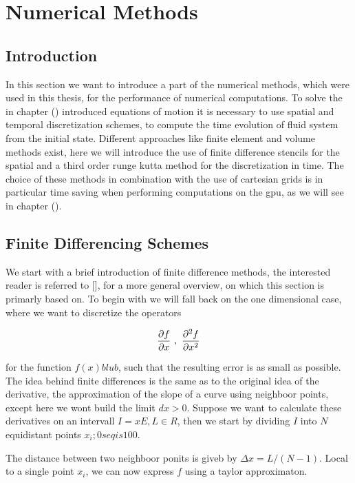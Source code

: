\chapter{Numerical Methods}

\section{Introduction}

In this section we want to introduce a part of the numerical methods, which were used in this thesis, for the performance of numerical computations.
To solve the in chapter () introduced equations of motion it is necessary to use spatial and temporal discretization schemes, to
compute the time evolution of fluid system from the initial state.
Different approaches like finite element and volume methods exist, here we will introduce the use of finite difference stencils for the
spatial and a third order runge kutta method for the discretization in time.
The choice of these methods in combination with the use of cartesian grids is in particular time saving when performing computations on the gpu, as we
will see in chapter ().

\section{Finite Differencing Schemes}

We start with a brief introduction of finite difference methods,
the interested reader is referred to [], for a more general overview, on which this section is primarly based on.
To begin with we will fall back on the one dimensional case, where we want to discretize the operators

\begin{align}
    \pdn[f]{x} \ , \ \pdn[^2f]{x^2}
\end{align}

for the function $f(x) blub$, such that the resulting error is as small as possible.
The idea behind finite differences is the same as to the original idea of the  derivative,
the approximation of the slope of a curve using neighboor points, except here we wont build the limit $dx>0$.
Suppose we want to calculate these derivatives on an intervall $I={xE}, L\in R$,
then we start by dividing $I$ into $N$ equidistant points $x_i; 0 seq i s 100$.

The distance between two neighboor ponits is giveb by $\Delta x = L/(N - 1)$.
Local to a single point $x_i$, we can now express $f$ using a taylor approximaton.

